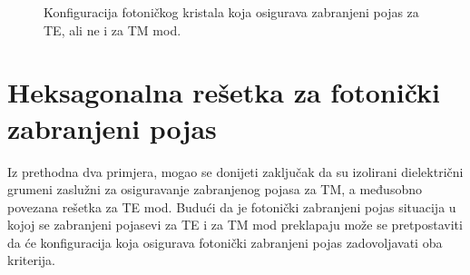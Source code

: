\documentclass[utf8, seminar, numeric]{fer}
\begin{document}
\begin{figure}[ht]
\centering
    \qquad
	\caption{Konfiguracija fotoničkog kristala koja osigurava zabranjeni pojas
	za TE, ali ne i za TM mod.}
	\label{fig:square_lattice_holes}
\end{figure}

\FloatBarrier

\section {Heksagonalna rešetka za fotonički zabranjeni pojas}\label{sec:fbg}

Iz prethodna dva primjera, mogao se donijeti zaključak da su izolirani
dielektrični grumeni zaslužni za osiguravanje zabranjenog pojasa za TM, a
međusobno povezana rešetka za TE mod. Budući da je fotonički zabranjeni pojas
situacija u kojoj se zabranjeni pojasevi za TE i za TM mod preklapaju može se
pretpostaviti da će konfiguracija koja osigurava fotonički zabranjeni pojas
zadovoljavati oba kriterija.
\end{document}
